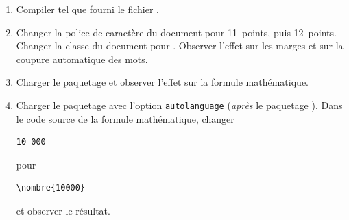 \begin{exercice}[nosol]
  \begin{enumerate}
  \item Compiler tel que fourni le fichier
    .
  \item Changer la police de caractère du document pour 11~points,
    puis 12~points. Changer la classe du document pour .
    Observer l'effet sur les marges et sur la coupure automatique des
    mots.
  \item Charger le paquetage  et observer l'effet sur la
    formule mathématique.
  \item Charger le paquetage  avec l'option
    \verb=autolanguage= (\emph{après} le paquetage ). Dans
    le code source de la formule mathématique, changer
\begin{lstlisting}
10 000
\end{lstlisting}
    pour
\begin{lstlisting}
\nombre{10000}
\end{lstlisting}
    et observer le résultat.
  \end{enumerate}
\end{exercice}


